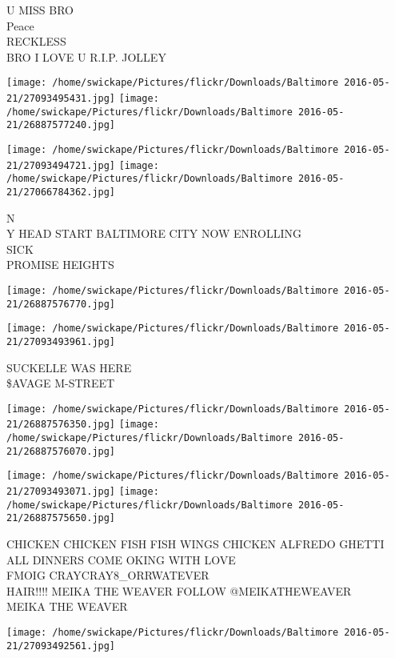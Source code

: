 \documentclass[10pt,letterpaper]{article}
\begin{document}
U MISS BRO\\
Peace\\
RECKLESS\\
BRO I LOVE U R.I.P. JOLLEY\\
\pagebreak

\texttt{[image: /home/swickape/Pictures/flickr/Downloads/Baltimore 2016-05-21/27093495431.jpg]}
\texttt{[image: /home/swickape/Pictures/flickr/Downloads/Baltimore 2016-05-21/26887577240.jpg]}

\texttt{[image: /home/swickape/Pictures/flickr/Downloads/Baltimore 2016-05-21/27093494721.jpg]}
\texttt{[image: /home/swickape/Pictures/flickr/Downloads/Baltimore 2016-05-21/27066784362.jpg]}

N\\
Y HEAD START BALTIMORE CITY NOW ENROLLING\\
SICK\\
PROMISE HEIGHTS\\
\pagebreak

\texttt{[image: /home/swickape/Pictures/flickr/Downloads/Baltimore 2016-05-21/26887576770.jpg]}

\vspace{0.25in}
\texttt{[image: /home/swickape/Pictures/flickr/Downloads/Baltimore 2016-05-21/27093493961.jpg]}

SUCKELLE WAS HERE\\
\$AVAGE M{-}STREET\\
\pagebreak

\texttt{[image: /home/swickape/Pictures/flickr/Downloads/Baltimore 2016-05-21/26887576350.jpg]}
\texttt{[image: /home/swickape/Pictures/flickr/Downloads/Baltimore 2016-05-21/26887576070.jpg]}

\texttt{[image: /home/swickape/Pictures/flickr/Downloads/Baltimore 2016-05-21/27093493071.jpg]}
\texttt{[image: /home/swickape/Pictures/flickr/Downloads/Baltimore 2016-05-21/26887575650.jpg]}

CHICKEN CHICKEN FISH FISH WINGS CHICKEN ALFREDO GHETTI ALL DINNERS COME OKING WITH LOVE\\
FMOIG CRAYCRAY8\_ORRWATEVER\\
HAIR!!!! MEIKA THE WEAVER FOLLOW @MEIKATHEWEAVER\\
MEIKA THE WEAVER\\
\pagebreak

\texttt{[image: /home/swickape/Pictures/flickr/Downloads/Baltimore 2016-05-21/27093492561.jpg]}
\end{document}
